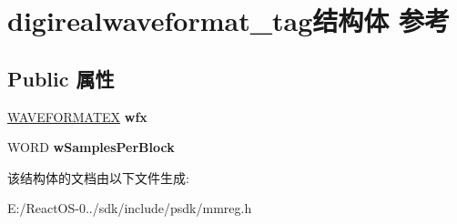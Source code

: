 \hypertarget{structdigirealwaveformat__tag}{}\section{digirealwaveformat\+\_\+tag结构体 参考}
\label{structdigirealwaveformat__tag}
\subsection*{Public 属性}
\begin{DoxyCompactItemize}
\item 
\mbox{\label{structdigirealwaveformat__tag_a036f7f819ba9b381401a8b742dd408e3}} 
\hyperlink{struct_w_a_v_e_f_o_r_m_a_t_e_x}{W\+A\+V\+E\+F\+O\+R\+M\+A\+T\+EX} {\bfseries wfx}
\item 
\mbox{\label{structdigirealwaveformat__tag_a635bd043c9564ae17a1ed63624156542}} 
W\+O\+RD {\bfseries w\+Samples\+Per\+Block}
\end{DoxyCompactItemize}


该结构体的文档由以下文件生成\+:\begin{DoxyCompactItemize}
\item 
E\+:/\+React\+O\+S-\/0../sdk/include/psdk/mmreg.\+h\end{DoxyCompactItemize}
